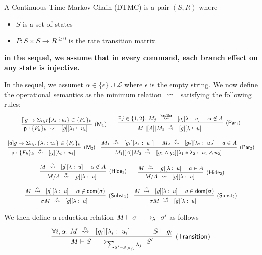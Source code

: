 \begin{definition}
  A Continuous Time Markov Chain (DTMC) is a pair $(S,R)$ where
  \begin{itemize}
  \item $S$ is a set of states
  \item $P: S\times S \rightarrow  R^{\geq 0}$ is the rate
    transition matrix.
  \end{itemize}
\end{definition}

\newpage

{\bf in the sequel, we assume that in every command, each branch
  effect on any state is injective.}


In the sequel, we assumet $\alpha\in\{\epsilon\}\cup \mathcal L$ where
$\epsilon$ is the empty string. We now define the operational
semantics as the minimum relation $\ \stackrel{}{\rightsquigarrow}\ {}$ satisfying the
following rules:
% 
\begin{displaymath}\small
  \begin{array}{ccc}
    \infer[\mathsf{(M_1)}]
    { {\role{p}:\{F_k\}_k} \prismred{}\lab{g}{\lambda_i}{u_i} }
    {\command {}g\lambda u\in\{F_k\}_k}
    \qquad
    \infer[\mathsf{(Par_1)}]
    {M_1\ppp A M_2\prismred{a}\lab g\lambda u }
    {
    \exists j\in\{1,2\}.\ 
    M_j\prismred{\aplha}\lab g\lambda u
    & \alpha\not\in A
    }
    \\\\
    \infer[\mathsf{(M_2)}]
    { {\role{p}:\{F_k\}_k} \prismred{a}\lab{g}{\lambda_i}{u_i} }
    {\command ag\lambda u\in\{F_k\}_k}
    \quad
    \infer[\mathsf{(Par_2)}]
    {M_1\ppp A M_2\prismred{a}\lab{g_1\land g_2}{\lambda_1*\lambda_2}{u_1\land u_2} }
    {
    M_1\prismred{a}\lab{g_1}{\lambda_1}{u_1} 
    & M_2\prismred{a}\lab{g_2}{\lambda_2}{u_2} 
                 & a\in A}
    \\\\\
    \infer[\mathsf{(Hide_1)}]
    {
    M/A\prismred{\alpha}\lab g\lambda u
    }
    {
    M\prismred{\alpha}\lab g\lambda u
    & \alpha\not\in A
    }
    \qquad
    \infer[\mathsf{(Hide_2)}]
    {
    M/A\prismred{}\lab g\lambda u
    }
    {
    M\prismred{a}\lab g\lambda u
    & a\in A
    }
    \\\\
    \infer[\mathsf{(Subst_1)}]
    {
    \sigma M\prismred{\alpha}\lab g\lambda u
    }
    {
    M\prismred{\alpha}\lab g\lambda u
    & \alpha\not\in\mathsf{dom}(\sigma)
      }
    \quad
    \infer[\mathsf{(Subst_2)}]
    {
    \sigma M\prismred{\sigma a}\lab g\lambda u
    }
    {
    M\prismred{a}\lab g\lambda u
    & a\in\mathsf{dom}(\sigma)
      }
    
  \end{array}
\end{displaymath}

We then define a reduction relation $M\vdash \sigma\ \longrightarrow_{\lambda}\ \sigma'$ as follows
$$
\infer[\mathsf{(Transition)}]
{
  M\vdash S\red{\sum_{S'= S[u_j]} \lambda_j}S'
}
{
  \forall i,\alpha.\ M\prismred{\alpha}\lab {g_i}{\lambda_i}{u_i}
  \quad&\quad
  S\vdash g_i
}
$$

